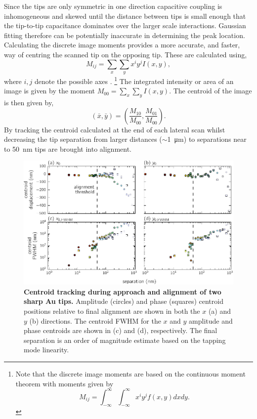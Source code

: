 \documentclass{article}
\begin{document}
Since the tips are only symmetric in one direction capacitive coupling is {\color{red}inhomogeneous and skewed} until the distance between tips is small enough that the tip-to-tip capacitance dominates over the larger scale interactions. Gaussian fitting therefore can be potentially inaccurate in determining the peak location. Calculating the discrete image moments provides a more accurate, and faster, way of centring the scanned tip on the opposing tip. These are calculated using,
\begin{equation}
M_{ij} = \sum_x \sum_y x^i y^j I(x,y),
\end{equation}
where $i,j$ denote the possible axes \cite{}.%
\footnote{Note that the discrete image moments are based on the continuous moment theorem with moments given by $$M_{ij} = \int_{-\infty}^{\infty} \int_{-\infty}^{\infty} x^i y^j f(x,y) dx dy.$$}
The integrated intensity {\color{red}or area} of an image is given by the moment $M_{00} = \sum_x \sum_y I(x,y)$. The centroid of the image is then given by,
\begin{equation}
(\bar{x},\bar{y}) = \left( \frac{M_{10}}{M_{00}}, \frac{M_{01}}{M_{00}} \right).
\end{equation}
By tracking the centroid calculated at the end of each lateral scan whilst decreasing the tip separation from larger distances ($\sim$\SI{1}{\micro\metre}) to separations near to \SI{50}{nm} tips are brought into alignment.

\begin{figure}[h]
\centering
\includegraphics{figures/centroid_tracking}
\caption[Centroid tracking during approach and alignment of two sharp Au tips]{\textbf{Centroid tracking during approach and alignment of two sharp Au tips.} Amplitude (circles) and phase (squares) centroid positions relative to final alignment are shown in both the $x$ (a) and $y$ (b) directions. The centroid FWHM for the $x$ and $y$ amplitude and phase centroids are shown in (c) and (d), respectively. The final separation is an order of magnitude estimate based on the tapping mode linearity.}
\label{fig:centroid_tracking}
\end{figure}
\end{document}
